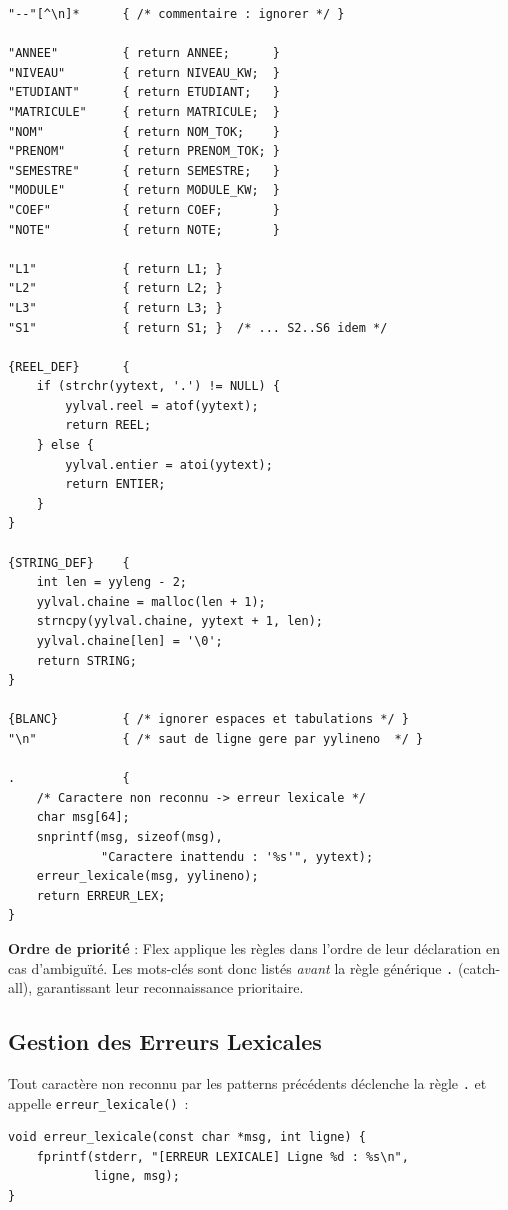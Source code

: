 \documentclass[a4paper,12pt]{article}
\begin{document}
\begin{lstlisting}[caption={Extrait des règles de reconnaissance dans lexer.l}, style=flex, label=lst:regles-lex]
"--"[^\n]*      { /* commentaire : ignorer */ }

"ANNEE"         { return ANNEE;      }
"NIVEAU"        { return NIVEAU_KW;  }
"ETUDIANT"      { return ETUDIANT;   }
"MATRICULE"     { return MATRICULE;  }
"NOM"           { return NOM_TOK;    }
"PRENOM"        { return PRENOM_TOK; }
"SEMESTRE"      { return SEMESTRE;   }
"MODULE"        { return MODULE_KW;  }
"COEF"          { return COEF;       }
"NOTE"          { return NOTE;       }

"L1"            { return L1; }
"L2"            { return L2; }
"L3"            { return L3; }
"S1"            { return S1; }  /* ... S2..S6 idem */

{REEL_DEF}      {
    if (strchr(yytext, '.') != NULL) {
        yylval.reel = atof(yytext);
        return REEL;
    } else {
        yylval.entier = atoi(yytext);
        return ENTIER;
    }
}

{STRING_DEF}    {
    int len = yyleng - 2;
    yylval.chaine = malloc(len + 1);
    strncpy(yylval.chaine, yytext + 1, len);
    yylval.chaine[len] = '\0';
    return STRING;
}

{BLANC}         { /* ignorer espaces et tabulations */ }
"\n"            { /* saut de ligne gere par yylineno  */ }

.               {
    /* Caractere non reconnu -> erreur lexicale */
    char msg[64];
    snprintf(msg, sizeof(msg),
             "Caractere inattendu : '%s'", yytext);
    erreur_lexicale(msg, yylineno);
    return ERREUR_LEX;
}
\end{lstlisting}

\textbf{Ordre de priorité} : Flex applique les règles dans l'ordre de leur déclaration en cas d'ambiguïté. Les mots-clés sont donc listés \textit{avant} la règle générique \texttt{.} (catch-all), garantissant leur reconnaissance prioritaire.

\subsection{Gestion des Erreurs Lexicales}

Tout caractère non reconnu par les patterns précédents déclenche la règle \texttt{.} et appelle \texttt{erreur\_lexicale()}~:

\begin{lstlisting}[caption={Fonction de signalement d'erreur lexicale}, style=c, label=lst:err-lex]
void erreur_lexicale(const char *msg, int ligne) {
    fprintf(stderr, "[ERREUR LEXICALE] Ligne %d : %s\n",
            ligne, msg);
}
\end{lstlisting}
\end{document}
